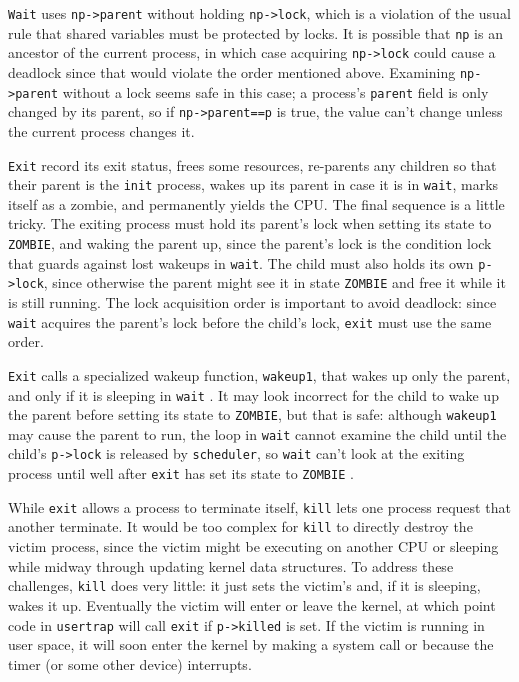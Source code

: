 \lstinline{Wait} uses \lstinline{np->parent} without holding
\lstinline{np->lock}, which is a violation of the usual rule that
shared variables must be protected by locks. It is possible that
\lstinline{np} is an ancestor of the current process, in which case
acquiring \lstinline{np->lock} could cause a deadlock since that would
violate the order mentioned above. Examining \lstinline{np->parent}
without a lock seems safe in this case; a process's \lstinline{parent}
field is only changed by its parent, so if \lstinline{np->parent==p}
is true, the value can't change unless the current process changes it.

\lstinline{Exit}
record its exit status,
frees some resources,
re-parents any children so that their parent is
the \lstinline{init} process,
wakes up its parent in case it is in \lstinline{wait},
marks itself as a zombie, and permanently
yields the CPU.
The final sequence is a little tricky.
The exiting process must hold its parent's lock when
setting its state to \lstinline{ZOMBIE}, and
waking the parent up, since the parent's lock
is the condition lock
that guards against lost wakeups in \lstinline{wait}. The child must also
holds its own \lstinline{p->lock}, since otherwise the parent
might see it in state \lstinline{ZOMBIE} and free it while
it is still running.
The lock acquisition order is important to avoid deadlock: since \lstinline{wait}
acquires the parent's lock before the child's lock,
\lstinline{exit} must use the same order.

\lstinline{Exit} calls a specialized wakeup function,
\lstinline{wakeup1}, that wakes up only the parent,
and only if it is sleeping in 
\lstinline{wait}
.
It may look incorrect for the child to wake up the parent
before setting its state to \lstinline{ZOMBIE}, 
but that is safe:
although
\lstinline{wakeup1}
may cause the parent to run,
the loop in
\lstinline{wait}
cannot examine the child until the child's
\lstinline{p->lock}
is released by {\tt scheduler},
so
\lstinline{wait}
can't look at
the exiting process until well after
\lstinline{exit}
has set its state to
\lstinline{ZOMBIE}
.

While
\lstinline{exit} 
allows a process to terminate itself,
\lstinline{kill}
lets one process request that another terminate.
It would be too complex for
\lstinline{kill}
to directly destroy the victim process, since the victim
might be executing on another CPU or sleeping
while midway through updating kernel data structures.
To address these challenges, 
\lstinline{kill}
does very little: it just sets the victim's
and, if it is sleeping, wakes it up.
Eventually the victim will enter or leave the kernel,
at which point code in
\lstinline{usertrap}
will call
\lstinline{exit}
if
\lstinline{p->killed}
is set.
If the victim is running in user space, it will soon enter
the kernel by making a system call or because the timer (or
some other device) interrupts.

